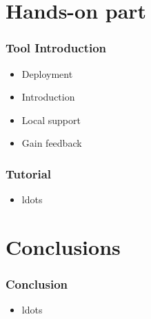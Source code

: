 \section{Hands-on part}

\begin{frame}[fragile]
\frametitle{Tool Introduction}
\begin{itemize}
\item Deployment
\item Introduction
\item Local support
\item Gain feedback
\end{itemize}
\end{frame}

\begin{frame}[fragile]
\frametitle{Tutorial}
\begin{itemize}
\item ldots
\end{itemize}
\end{frame}

\section{Conclusions}

\begin{frame}[fragile]
\frametitle{Conclusion}
\begin{itemize}
\item ldots
\end{itemize}
\end{frame}

